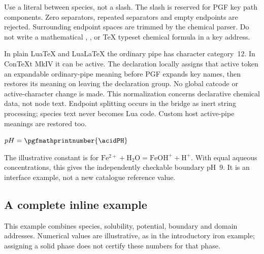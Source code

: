 \documentclass[a4paper,11pt]{ltxdoc}
\begin{document}
Use a literal \texttt{} between species, not a slash. The slash is reserved for
PGF key path components. Zero separators, repeated separators and empty endpoints
are rejected. Surrounding endpoint spaces are trimmed by the chemical parser.
Do not write a mathematical , , or TeX typeset chemical formula
in a key address.

In plain LuaTeX and LuaLaTeX the ordinary pipe has character category~12. In
ConTeXt MkIV it can be active. The declaration locally assigns that active token
an expandable ordinary-pipe meaning before PGF expands key names, then restores
its meaning on leaving the declaration group. No global catcode or active-character
change is made. This normalization concerns declarative chemical data, not node
text. Endpoint splitting occurs in the bridge as inert string processing; species
text never becomes Lua code. Custom host active-pipe meanings are restored too.

\begin{codeexample}[width=6cm]
\acidHandle
\edef\acidRoot{/pgfplots/pourbaix/data/\acidHandle}
\pgfkeysgetvalue{\acidRoot/a-temp/pH}\acidPH
$pH=\pgfmathprintnumber{\acidPH}$
\end{codeexample}
The illustrative constant is for
$\mathrm{Fe^{2+}+H_2O= FeOH^++H^+}$.
With equal aqueous concentrations, this gives the independently checkable
boundary pH~9. It is an interface example, not a new catalogue reference value.

\subsection{A complete inline example}
This example combines species, solubility, potential, boundary and domain
addresses. Numerical values are illustrative, as in the introductory iron example;
assigning a solid phase does not certify these numbers for that phase.
\end{document}
